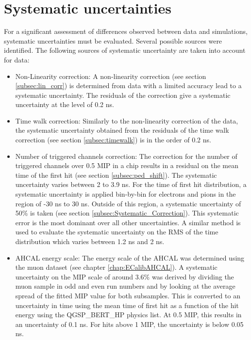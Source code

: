 \section{Systematic uncertainties}

For a significant assessment of differences observed between data and simulations, systematic uncertainties must be evaluated. Several possible sources were identified. The following sources of systematic uncertainty are taken into account for data:

\begin{itemize}
	\item Non-Linearity correction: A non-linearity correction (see section \ref{subsec:lin_corr}) is determined from data with a limited accuracy lead to a systematic uncertainty. The residuals of the correction give a systematic uncertainty at the level of 0.2 ns.
	\item Time walk correction: Similarly to the non-linearity correction of the data, the systematic uncertainty obtained from the residuals of the time walk correction (see section \ref{subsec:timewalk}) is in the order of 0.2 ns.
	\item Number of triggered channels correction: The correction for the number of triggered channels over 0.5 MIP in a chip results in a residual on the mean time of the first hit (see section \ref{subsec:ped_shift}). The systematic uncertainty varies between 2 to 3.9 ns. For the time of first hit distribution, a systematic uncertainty is applied bin-by-bin for electrons and pions in the region of -30 ns to 30 ns. Outside of this region, a systematic uncertainty of 50\% is taken (see section \ref{subsec:Systematic_Correction}). This systematic error is the most dominant over all other uncertainties. A similar method is used to evaluate the systematic uncertainty on the RMS of the time distribution which varies between 1.2 ns and 2 ns.
	\item AHCAL energy scale: The energy scale of the AHCAL was determined using the muon dataset (see chapter \ref{chap:ECalibAHCAL}). A systematic uncertainty on the MIP scale of around 3.6\% was derived by dividing the muon sample in odd and even run numbers and by looking at the average spread of the fitted MIP value for both subsamples. This is converted to an uncertainty in time using the mean time of first hit as a function of the hit energy using the QGSP\_BERT\_HP physics list. At 0.5 MIP, this results in an uncertainty of 0.1 ns. For hits above 1 MIP, the uncertainty is below 0.05 ns.
\end{itemize}

